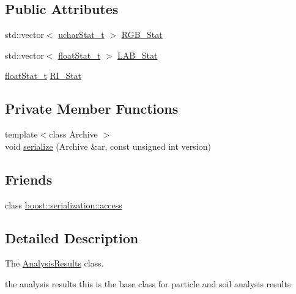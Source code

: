 \subsection*{Public Attributes}
\begin{DoxyCompactItemize}
\item 
std\+::vector$<$ \hyperlink{_stats_8h_a5b876b087ada3df30b8dd6309fc25191}{uchar\+Stat\+\_\+t} $>$ \hyperlink{class_soil_analyzer_1_1_analysis_results_a302530d86430df909abd58164eb0baa8}{R\+G\+B\+\_\+\+Stat}
\item 
std\+::vector$<$ \hyperlink{_stats_8h_a5f9676504b14f796e82c229b4dddc50b}{float\+Stat\+\_\+t} $>$ \hyperlink{class_soil_analyzer_1_1_analysis_results_ae931f7b47ece1f91dc3427520ef4a9b2}{L\+A\+B\+\_\+\+Stat}
\item 
\hyperlink{_stats_8h_a5f9676504b14f796e82c229b4dddc50b}{float\+Stat\+\_\+t} \hyperlink{class_soil_analyzer_1_1_analysis_results_a3bbccb36afd62b9a35b7afa578c4919d}{R\+I\+\_\+\+Stat}
\end{DoxyCompactItemize}
\subsection*{Private Member Functions}
\begin{DoxyCompactItemize}
\item 
{\footnotesize template$<$class Archive $>$ }\\void \hyperlink{class_soil_analyzer_1_1_analysis_results_a64f3587b6a868fc82a72369b3883459a}{serialize} (Archive \&ar, const unsigned int version)
\end{DoxyCompactItemize}
\subsection*{Friends}
\begin{DoxyCompactItemize}
\item 
class \hyperlink{class_soil_analyzer_1_1_analysis_results_ac98d07dd8f7b70e16ccb9a01abf56b9c}{boost\+::serialization\+::access}
\end{DoxyCompactItemize}


\subsection{Detailed Description}
The \hyperlink{class_soil_analyzer_1_1_analysis_results}{Analysis\+Results} class. 

the analysis results this is the base class for particle and soil analysis results 

